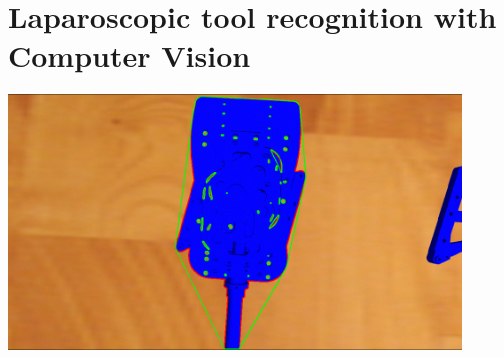 \section{Laparoscopic tool recognition with Computer Vision}

\begin{center}
\includegraphics[width=12cm]{images/opencv-tool-convex-hull.png}\\[1cm]
\end{center}